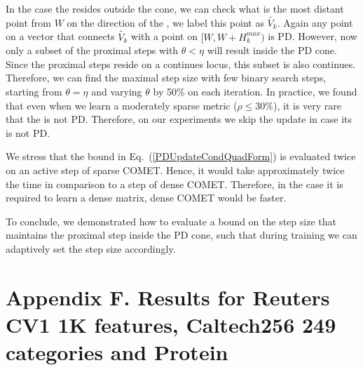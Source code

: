 \documentclass[twoside,11pt]{article}
\newcommand\mat[1]{{#1}}
\newcommand{\W}{\mat{W}}
\newcommand{\Hk}{H_k}
\newcommand{\Vk}{\mat{V_k}}
\renewcommand{\eqref}[1]{Eq.~(\ref{#1})}
\begin{document}
In the case the \Vkorigin resides outside the cone, we can check what is the most distant point from $\W$ on the direction of the \Vkorigin, we label this point as $\widetilde{\Vk}$. Again any point on a vector that connects $\widetilde{\Vk}$ with a point on $[\W, \W + \Hk^{max})$ is PD. However, now only a subset of the proximal steps with $\theta < \eta$ will result inside the PD cone. Since the proximal steps reside on a continues locus, this subset is also continues. Therefore, we can find the maximal step size with few binary search steps, starting from $\theta = \eta$ and varying $\theta$ by 50\% on each iteration. In practice, we found that even when we learn a moderately sparse metric ($\rho \leq 30\%$), it is very rare that the \Vkorigin is not PD. Therefore, on our experiments we skip the update in case its \Vkorigin is not PD.

We stress that the bound in \eqref{PDUpdateCondQuadForm} is evaluated twice on an active step of sparse COMET. Hence, it would take approximately twice the time in comparison to a step of dense COMET. Therefore, in the case it is required to learn a dense matrix, dense COMET would be faster.

To conclude, we demonstrated how to evaluate a bound on the step size that maintains the proximal step inside the PD cone, such that during training we can adaptively set the step size accordingly.

\section*{Appendix F. Results for Reuters CV1 1K features, Caltech256 249 categories and Protein}
\end{document}
